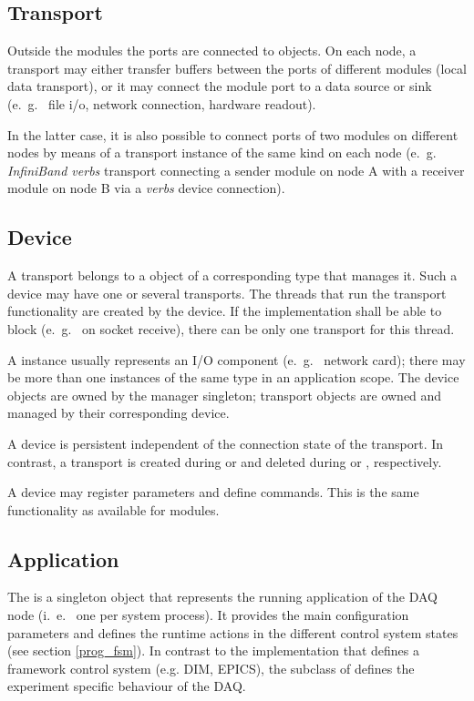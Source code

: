 \subsection{Transport}
Outside the modules the ports are connected to 
  objects.
On each node, a transport may either transfer buffers between 
the ports of different modules (local data transport), or it may connect the module port to a data 
source or sink (e.~g.~ file i/o, network connection, hardware readout).

In the latter case, it is also possible  to connect ports of two modules on 
different nodes by means of a transport instance of the same kind on 
each node (e.~g.~ {\em InfiniBand verbs} transport connecting a sender module on node A with a receiver
module on node B via a {\em verbs} device connection).


\subsection{Device}
A transport belongs to a  
 object of a 
corresponding type that manages it. Such a device may have one or several transports.  
The threads that run the transport functionality are
created by the device. If the  implementation 
shall be able to block (e.~g.~ on socket receive), there can be only 
one transport for this thread. 

A  instance usually represents an I/O component (e.~g.~ network card); 
there may be more than one  instances of the same 
type in an application scope. 
The device objects are owned by the manager 
singleton; transport objects are owned and managed by their corresponding device.  

A device is persistent independent of the connection state 
of the transport. In contrast, a transport is created 
during  or 
and deleted during  or , respectively. 

A device may register parameters and define 
commands. This is the same functionality as available for modules.   


\subsection{Application}
The  
is a singleton object that represents the running application of the DAQ node 
(i.~e.~ one per system process). It provides the main configuration parameters
and defines the runtime actions in the different control system states (see section \ref{prog_fsm}).
In contrast to the  implementation that defines a framework control system (e.g. DIM, EPICS), the subclass of  defines the experiment specific behaviour of the DAQ.


